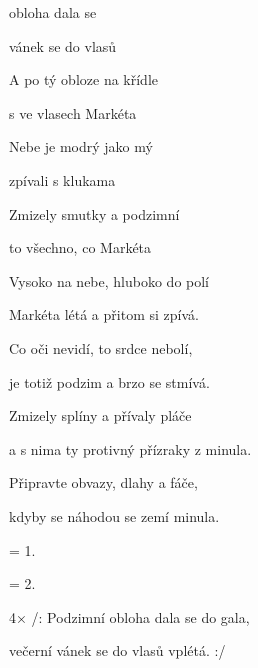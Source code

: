 

\zs
{} obloha dala se 

 vánek se do vlasů 

A po tý obloze na křídle 

s  ve vlasech Markéta 

Nebe je modrý jako mý 

 zpívali s klukama 

Zmizely smutky a podzimní 

 to všechno, co Markéta 
\ks

\zs
Vysoko na nebe, hluboko do polí

Markéta létá a přitom si zpívá.

Co oči nevidí, to srdce nebolí,

je totiž podzim a brzo se stmívá.

Zmizely splíny a přívaly pláče

a s nima ty protivný přízraky z minula.

Připravte obvazy, dlahy a fáče,

kdyby se náhodou se zemí minula.
\ks

\zs
= 1.
\ks

\zs
= 2.
\ks

4× /: Podzimní obloha dala se do gala,

večerní vánek se do vlasů vplétá. :/

\kp
